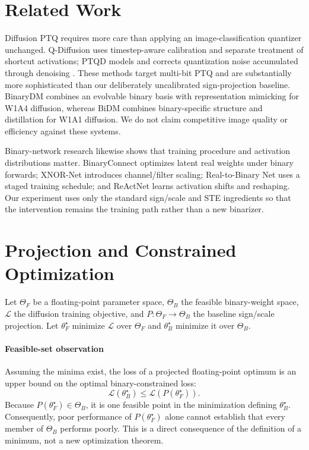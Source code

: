 \documentclass[conference]{IEEEtran}
\begin{document}
\section{Related Work}

Diffusion PTQ requires more care than applying an image-classification
quantizer unchanged. Q-Diffusion uses timestep-aware calibration and separate
treatment of shortcut activations\cite{li2023qdiffusion}; PTQD models and
corrects quantization noise accumulated through denoising
\cite{he2023ptqd}. These methods target multi-bit PTQ and are substantially more
sophisticated than our deliberately uncalibrated sign-projection baseline.
BinaryDM combines an evolvable binary basis with representation mimicking for
W1A4 diffusion\cite{binarydm2025}, whereas BiDM combines binary-specific
structure and distillation for W1A1 diffusion\cite{bidm2024}. We do not claim
competitive image quality or efficiency against these systems.

Binary-network research likewise shows that training procedure and activation
distributions matter. BinaryConnect optimizes latent real weights under binary
forwards\cite{courbariaux2015binaryconnect}; XNOR-Net introduces channel/filter
scaling\cite{rastegari2016xnornet}; Real-to-Binary Net uses a staged training
schedule\cite{martinez2020training}; and ReActNet learns activation shifts and
reshaping\cite{liu2020reactnet}. Our experiment uses only the standard
sign/scale and STE ingredients so that the intervention remains the training
path rather than a new binarizer.

\section{Projection and Constrained Optimization}

Let $\Theta_F$ be a floating-point parameter space, $\Theta_B$ the feasible
binary-weight space, $\mathcal L$ the diffusion training objective, and
$P:\Theta_F\rightarrow\Theta_B$ the baseline sign/scale projection. Let
$\theta_F^\star$ minimize $\mathcal L$ over $\Theta_F$ and
$\theta_B^\star$ minimize it over $\Theta_B$.

\paragraph{Feasible-set observation}
Assuming the minima exist, the loss of a projected floating-point optimum is an
upper bound on the optimal binary-constrained loss:
\begin{equation}
\mathcal L(\theta_B^\star)
\leq \mathcal L(P(\theta_F^\star)).
\end{equation}
Because $P(\theta_F^\star)\in\Theta_B$, it is one feasible point in the
minimization defining $\theta_B^\star$. Consequently, poor performance of
$P(\theta_F^\star)$ alone cannot establish that every member of $\Theta_B$
performs poorly. This is a direct consequence of the definition of a minimum,
not a new optimization theorem.
\end{document}
